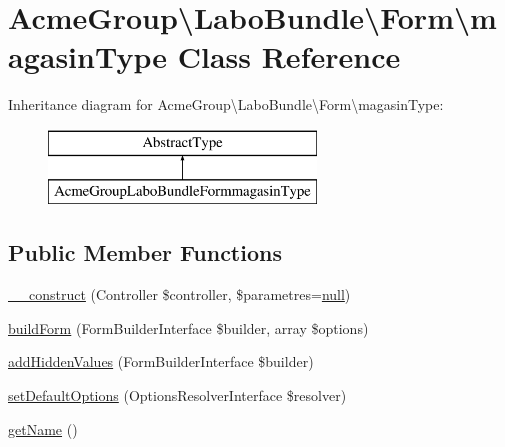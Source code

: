 \hypertarget{class_acme_group_1_1_labo_bundle_1_1_form_1_1magasin_type}{\section{Acme\+Group\textbackslash{}Labo\+Bundle\textbackslash{}Form\textbackslash{}magasin\+Type Class Reference}
\label{class_acme_group_1_1_labo_bundle_1_1_form_1_1magasin_type}
}
Inheritance diagram for Acme\+Group\textbackslash{}Labo\+Bundle\textbackslash{}Form\textbackslash{}magasin\+Type\+:\begin{figure}[H]
\begin{center}
\leavevmode
\includegraphics[height=2.000000cm]{class_acme_group_1_1_labo_bundle_1_1_form_1_1magasin_type}
\end{center}
\end{figure}
\subsection*{Public Member Functions}
\begin{DoxyCompactItemize}
\item 
\hyperlink{class_acme_group_1_1_labo_bundle_1_1_form_1_1magasin_type_aab5c6387917541771c72d037934f3449}{\+\_\+\+\_\+construct} (Controller \$controller, \$parametres=\hyperlink{validate_8js_afb8e110345c45e74478894341ab6b28e}{null})
\item 
\hyperlink{class_acme_group_1_1_labo_bundle_1_1_form_1_1magasin_type_afbcd3b2d6005f025962f8a611b55e412}{build\+Form} (Form\+Builder\+Interface \$builder, array \$options)
\item 
\hyperlink{class_acme_group_1_1_labo_bundle_1_1_form_1_1magasin_type_a2f4bc24a440e75195105147fcf2969b4}{add\+Hidden\+Values} (Form\+Builder\+Interface \$builder)
\item 
\hyperlink{class_acme_group_1_1_labo_bundle_1_1_form_1_1magasin_type_a0d9dbb88fa9934a486909ba15bcf918c}{set\+Default\+Options} (Options\+Resolver\+Interface \$resolver)
\item 
\hyperlink{class_acme_group_1_1_labo_bundle_1_1_form_1_1magasin_type_a7c6a8101ccd7de3d638c74ad126f16cd}{get\+Name} ()
\end{DoxyCompactItemize}



